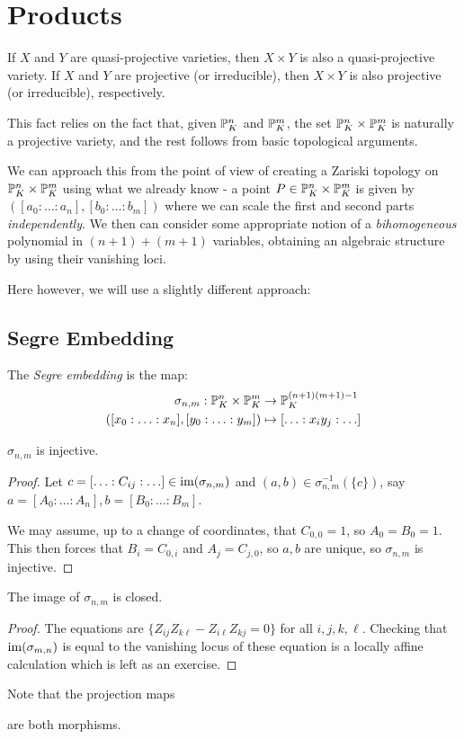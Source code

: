 \documentclass[10pt,a4paper,rgb]{article}
\begin{document}
\section{Products}
If $X$ and $Y$ are quasi-projective varieties, then $X \times Y$ is also a quasi-projective variety. If $X$ and $Y$ are projective (or irreducible), then $X \times Y$ is also projective (or irreducible), respectively.

This fact relies on the fact that, given $\P^n_K$ and $\P^m_K$, the set $\P^n_K \times \P^m_K$ is naturally a projective variety, and the rest follows from basic topological arguments.

We can approach this from the point of view of creating a Zariski topology on $\P^n_K \times \P^m_K$ using what we already know - a point $P \in \P^n_K \times \P^m_K$ is given by $([a_0:\ldots:a_n],[b_0:\ldots:b_m])$ where we can scale the first and second parts \textit{independently}. We then can consider some appropriate notion of a \emph{bihomogeneous} polynomial in $(n+1)+(m+1)$ variables, obtaining an algebraic structure by using their vanishing loci.

Here however, we will use a slightly different approach:
\subsection{Segre Embedding}
The \emph{Segre embedding} is the map:
\begin{align*}
\sigma_{n,m}:\P^n_K \times \P^m_K &\to \P^{(n+1)(m+1)-1}_K\\
([x_0:\ldots:x_n],[y_0:\ldots:y_m]) &\mapsto [\ldots: x_iy_j:\ldots]
\end{align*}
\begin{claim}
$\sigma_{n,m}$ is injective.
\end{claim}
\begin{proof}
Let $c = [\ldots:C_{ij}:\ldots] \in \Image(\sigma_{n,m})$ and $(a,b) \in \sigma_{n,m}^{-1}(\{c\})$, say $a = [A_0:\ldots:A_n], b = [B_0:\ldots:B_m]$.

We may assume, up to a change of coordinates, that $C_{0,0} = 1$, so $A_0 = B_0 = 1$. This then forces that $B_i = C_{0,i}$ and $A_j = C_{j,0}$, so $a,b$ are unique, so $\sigma_{n,m}$ is injective.
\end{proof}
\begin{claim}
The image of $\sigma_{n,m}$ is closed.
\end{claim}
\begin{proof}
The equations are $\{Z_{ij}Z_{k\ell} - Z_{i\ell}Z_{kj} = 0\}$ for all $i,j,k,\ell$. Checking that $\Image(\sigma_{m,n})$ is equal to the vanishing locus of these equation is a locally affine calculation which is left as an exercise.
\end{proof}
Note that the projection maps
are both morphisms.
\end{document}
